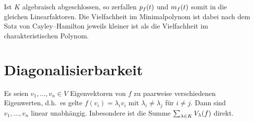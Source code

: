Ist $K$ algebraisch abgeschlossen, so zerfallen $p_{f}(t)$ und $m_{f}(t)$ somit in die gleichen Linearfaktoren.
Die Vielfachheit im Minimalpolynom ist dabei nach dem Satz von Cayley--Hamilton jeweils kleiner ist als die Vielfachheit im charakteristischen Polynom.





\section{Diagonalisierbarkeit}

\begin{lemma}
  \label{lemma: linear independence of eigenvectors}
  Es seien $v_1, \dotsc, v_n \in V$ Eigenvektoren von $f$ zu paarweise verschiedenen Eigenwerten, d.h.\ es gelte $f(v_i) = \lambda_i v_i$ mit $\lambda_i \neq \lambda_j$ für $i \neq j$.
  Dann sind $v_1, \dotsc, v_n$ linear unabhängig.
  Inbesondere ist die Summe $\sum_{\lambda \in K} V_{\lambda}(f)$ direkt.
\end{lemma}

